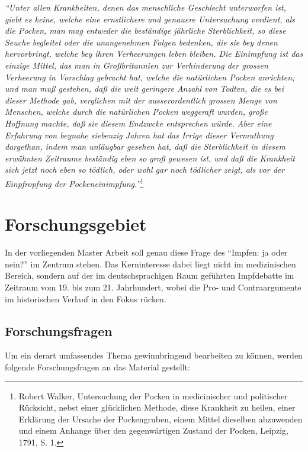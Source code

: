 \documentclass[
    a4paper,
    12pt,
    hyphens,
    chapterprefix=true,
    headheight=33pt,
    footheight=29pt,
    headings=optiontohead, %
]{scrartcl}
\begin{document}
\begin{center}
\textit{"`Unter allen Krankheiten, denen das menschliche Geschlecht unterworfen ist, giebt es keine, welche eine ernstlichere und genauere Untersuchung verdient, als die Pocken, man mag entweder die beständige jährliche Sterblichkeit, so diese Seuche begleitet oder die unangenehmen Folgen bedenken, die sie bey denen hervorbringt, welche bey ihren Verheerungen leben bleiben. Die Einimpfung ist das einzige Mittel, das man in Großbritannien zur Verhinderung der grossen Verheerung in Vorschlag gebracht hat, welche die natürlichen Pocken anrichten; und man muß gestehen, daß die weit geringere Anzahl von Todten, die es bei dieser Methode gab, verglichen mit der ausserordentlich grossen Menge von Menschen, welche durch die natürlichen Pocken weggeraft wurden, große Hoffnung machte, daß sie diesem Endzwcke entsprechen würde. Aber eine Erfahrung von beynahe siebenzig Jahren hat das Irrige dieser Vermuthung dargethan, indem man unläugbar gesehen hat, daß die Sterblichkeit in diesem erwähnten Zeitraume beständig eben so groß gewesen ist, und daß die Krankheit sich jetzt noch eben so tödlich, oder wohl gar noch tödlicher zeigt, als vor der Einpfropfung der Pockeneinimpfung."'}\footnote{Robert Walker, Untersuchung der Pocken in medicinischer und politischer Rücksicht, nebst einer glücklichen Methode, diese Krankheit zu heilen, einer Erklärung der Ursache der Pockengruben, einem Mittel dieselben abzuwenden und einem Anhange über den gegenwärtigen Zustand der Pocken, Leipzig, 1791, S. 1.}
\end{center}


\section{Forschungsgebiet}

In der vorliegenden Master Arbeit soll genau diese Frage des "`Impfen: ja oder nein?"' im Zentrum stehen. Das Kerninteresse dabei liegt nicht im medizinischen Bereich, sondern auf der im deutschsprachigen Raum geführten Impfdebatte im Zeitraum vom 19. bis zum 21. Jahrhundert, wobei die Pro- und Contraargumente im historischen Verlauf in den Fokus rücken.

\subsection{Forschungsfragen}
Um ein derart umfassendes Thema gewinnbringend bearbeiten zu können, werden folgende Forschungsfragen an das Material gestellt:
\end{document}
